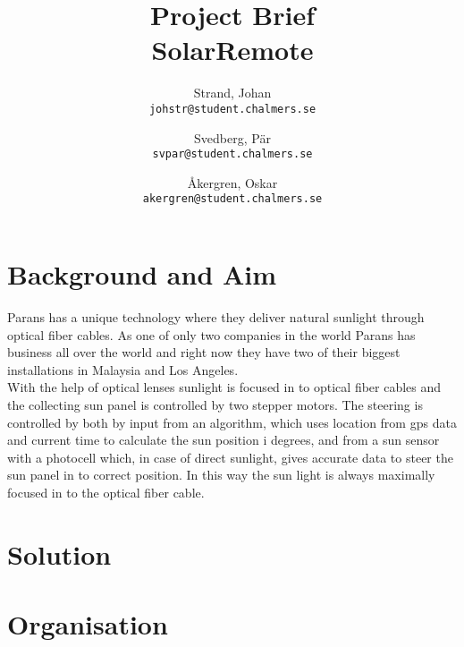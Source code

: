 \documentclass[a4paper]{article}
\author{	Strand, Johan \\ \texttt{johstr@student.chalmers.se} \and
			Svedberg, Pär\\ \texttt{svpar@student.chalmers.se} \and
			Åkergren, Oskar\\ \texttt{akergren@student.chalmers.se}
}
\title{\vspace{-3cm} Project Brief  \\ SolarRemote}
\begin{document}
	\maketitle
	\section*{Background and Aim} %
	\label{sec:background_and_aim}
	Parans has a unique technology where they deliver natural sunlight through optical fiber cables. As one of only two companies in the world Parans has business all over  the world and right now they have two of their biggest installations in Malaysia and Los Angeles. \\

	\noindent With the help of optical lenses sunlight is focused in to optical fiber cables and the collecting sun panel is controlled by two stepper motors. The steering is controlled by both by input from an algorithm, which uses location from gps data and current time to calculate the sun position i degrees, and from a sun sensor with a photocell which, in case of direct sunlight, gives accurate data to steer the sun panel in to correct position. In this way the sun light is always maximally focused in to the optical fiber cable.

	
	\section*{Solution} %
	\label{sec:solution}
	
	\section*{Organisation} %
	\label{sec:organisation}
	
\end{document}
